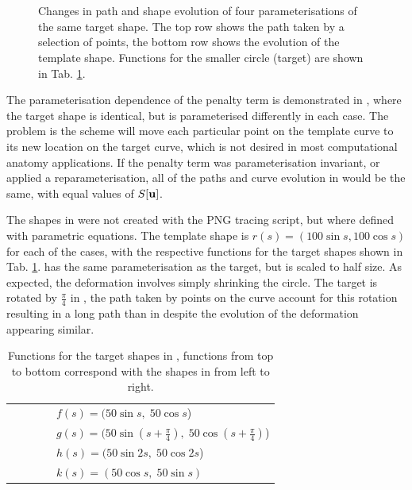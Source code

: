 \documentclass[a4paper, 12pt]{article}
\begin{document}
\begin{figure}[!h]
  \centering
  \\
  \\
  \caption[Reparameterisation of the target curve]{Changes in path and shape evolution of four parameterisations of the
    same target shape. The top row shows the path taken by a selection of points,
    the bottom row shows the evolution of the template shape. Functions for the smaller circle (target) are shown in Tab. \ref{tab:funs}.}
  \label{fig:reparams}
\end{figure}
The parameterisation dependence of the penalty term is demonstrated in
, where the target shape is identical, but is parameterised
differently in each case. The problem is the scheme will move each particular
point on the template curve to its new location on the target curve, which is
not desired in most computational anatomy applications. If the penalty term was
parameterisation invariant, or applied a reparameterisation, all of the paths
and curve evolution in  would be the same, with equal values of
$S[\mathbf{u}]$.

The shapes in  were not created with the PNG tracing script, but
where defined with parametric equations. The template shape is $r(s) = (100\sin
s, 100\cos s)$ for each of the cases, with the respective functions for the
target shapes shown in Tab. \ref{tab:funs}.  has the same
parameterisation as the target, but is scaled to half size. As expected, the
deformation involves simply shrinking the circle. The target is rotated by
$\frac{\pi}{4}$ in , the path taken by points on the curve account for this
rotation resulting in a long path than in  despite the  evolution
of the deformation appearing similar.

\begin{table}[!h]
\begin{tabular}[h]{l}
    $\quad\quad\quad\quad f(s) =  (50 \sin s,\; 50 \cos s$) \\
    $\quad\quad\quad\quad g(s) =  (50 \sin (s + \frac{\pi}{4}),\; 50\cos (s + \frac{\pi}{4})$)\\
    $\quad\quad\quad\quad h(s) =  (50 \sin 2s,\; 50 \cos 2s$) \\
    $\quad\quad\quad\quad k(s) =  (50 \cos s,\; 50 \sin s)$
 \end{tabular}
 \caption{Functions for the target shapes in , functions from top
   to bottom correspond with the shapes in  from left to right.}
 \label{tab:funs}
\end{table}
\end{document}
